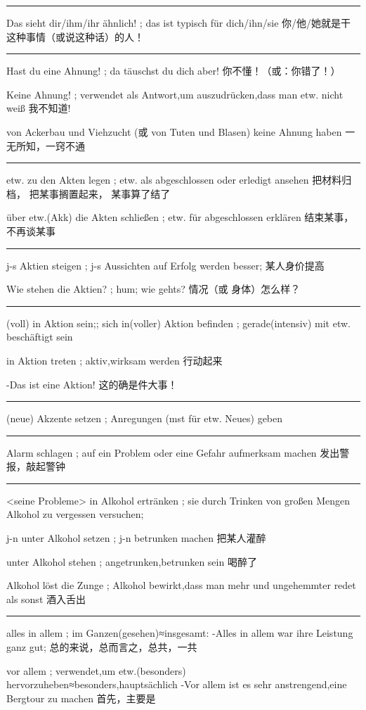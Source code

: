 \noindent\rule{\textwidth}{1pt}  
Das sieht dir/ihm/ihr ähnlich! ; das ist typisch für dich/ihn/sie
你/他/她就是干这种事情（或说这种话）的人！

\noindent\rule{\textwidth}{1pt}  
Hast du eine Ahnung! ; da täuschst du dich aber!
你不懂！（或：你错了！）

Keine Ahnung! ; verwendet als Antwort,um auszudrücken,dass man etw. nicht weiß
我不知道!

von Ackerbau und Viehzucht (或 von Tuten und Blasen) keine Ahnung haben
一无所知，一窍不通

\noindent\rule{\textwidth}{1pt}  
etw. zu den Akten legen ; etw. als abgeschlossen oder erledigt ansehen
把材料归档， 把某事搁置起来， 某事算了结了

über etw.(Akk) die Akten schließen ; etw. für abgeschlossen erklären
结束某事，不再谈某事

\noindent\rule{\textwidth}{1pt}  
j-s Aktien steigen ; j-s Aussichten auf Erfolg werden besser;
某人身价提高

Wie stehen die Aktien? ; hum; wie gehts?
情况（或 身体）怎么样？

\noindent\rule{\textwidth}{1pt}  
(voll) in Aktion sein;; sich in(voller) Aktion befinden ; gerade(intensiv) mit etw. beschäftigt sein

in Aktion treten ; aktiv,wirksam werden
行动起来

-Das ist eine Aktion!
这的确是件大事！

\noindent\rule{\textwidth}{1pt}  
(neue) Akzente setzen ; Anregungen (mst für etw. Neues) geben

\noindent\rule{\textwidth}{1pt}  
Alarm schlagen ; auf ein Problem oder eine Gefahr aufmerksam machen
发出警报，敲起警钟

\noindent\rule{\textwidth}{1pt}  
<seine Probleme> in Alkohol ertränken ; sie durch Trinken von großen Mengen Alkohol zu vergessen versuchen;

j-n unter Alkohol setzen ; j-n betrunken machen
把某人灌醉

unter Alkohol stehen ; angetrunken,betrunken sein
喝醉了

Alkohol löst die Zunge ; Alkohol bewirkt,dass man mehr und ungehemmter redet als sonst
酒入舌出

\noindent\rule{\textwidth}{1pt}  
alles in allem ; im Ganzen(gesehen)≈insgesamt: 
-Alles in allem war ihre Leistung ganz gut;
总的来说，总而言之，总共，一共

vor allem ; verwendet,um etw.(besonders) hervorzuheben≈besonders,hauptsächlich
-Vor allem ist es sehr anstrengend,eine Bergtour zu machen
首先，主要是

